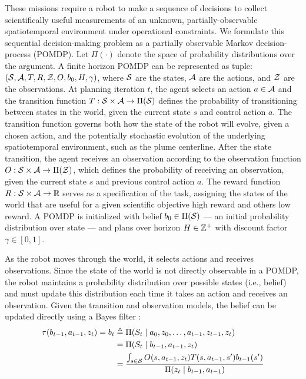 These missions require a robot to make a sequence of decisions to collect scientifically useful measurements of an unknown, partially-observable spatiotemporal environment under operational constraints. We formulate this sequential decision-making problem as a partially observable Markov decision-process (POMDP). Let $\Pi(\cdot)$ denote the space of probability distributions over the argument. A finite horizon POMDP can be represented as tuple: $(\mathcal{S}, \mathcal{A}, T, R, \mathcal{Z}, O, b_0, H, \gamma)$, where $\mathcal{S}$ are the states, $\mathcal{A}$ are the actions, and $\mathcal{Z}$ are the observations. At planning iteration $t$, the agent selects an action $a \in \mathcal{A}$ and the transition function $T: \mathcal{S} \times \mathcal{A} \to \Pi(\mathcal{S})$ defines the probability of transitioning between states in the world, given the current state $s$ and control action $a$. The transition function governs both how the state of the robot will evolve, given a chosen action, and the potentially stochastic evolution of the underlying spatiotemporal environment, such as the plume centerline. After the state transition, the agent receives an observation according to the observation function $O: \mathcal{S} \times \mathcal{A} \to \Pi(\mathcal{Z})$, which defines the probability of receiving an observation, given the current state $s$ and previous control action $a$. The reward function $R: \mathcal{S} \times \mathcal{A} \to \mathbb{R}$ serves as a specification of the task, assigning the states of the world that are useful for a given scientific objective high reward and others low reward. A POMDP is initialized with belief $b_0 \in \Pi(\mathcal{S})$ --- an initial probability distribution over state --- and plans over horizon $H \in \mathbb{Z}^+$ with discount factor $\gamma \in [0, 1]$.

As the robot moves through the world, it selects actions and receives observations. Since the state of the world is not directly observable in a POMDP, the robot maintains a probability distribution over possible states (i.e., belief) and must update this distribution each time it takes an action and receives an observation. Given the transition and observation models, the belief can be updated directly using a Bayes filter \cite{sarkka2013bayesian}:
\begin{align}
    \tau(b_{t-1}, a_{t-1}, z_t) = b_t
        &\triangleq \Pi(S_t \mid a_0, z_0, \dots, a_{t-1}, z_{t-1}, z_t) \\
        &= \Pi(S_t \mid b_{t-1}, a_{t-1}, z_t) \\
        &= \frac{\int_{s \in \mathcal{S}} O(s, a_{t-1}, z_t) T(s, a_{t-1}, s')b_{t-1}(s')}{\Pi(z_t \mid b_{t-1}, a_{t-1})}
    \label{eq:bayes_tau}
\end{align}

